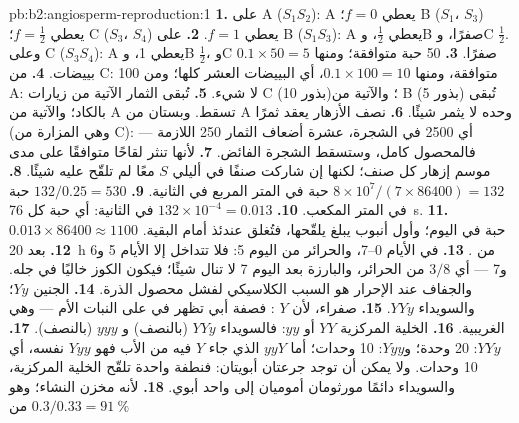 \begin{solution}{pb:b2:angiosperm-reproduction:1}
\textbf{1.} على A ($S_1S_2$):  A يعطي $f = 0$؛  B ($S_1$، $S_3$) يعطي $f =
\tfrac12$؛  C ($S_3$، $S_4$) يعطي $f = 1$.
\textbf{2.} على B ($S_1S_3$): A يعطي $\tfrac12$، وB صفرًا، وC $\tfrac12$. وعلى C
($S_3S_4$): A يعطي 1، وB $\tfrac12$، وC صفرًا.
\textbf{3.} 50 حبة متوافقة؛ ومنها $0.1\times 50 = 5$ بييضات.
\textbf{4.} من C: 100 متوافقة، ومنها $0.1\times 100 = 10$، أي
البييضات العشر كلها؛ ومن A: لا شيء.
\textbf{5.} تُبقى الثمار الآتية من زيارات C (10 بذور)؛ والآتية من B (5 بذور)
تُبقى بالكاد؛ والآتية من A تسقط. وبستان من A وحده لا يثمر شيئًا.
\textbf{6.} نصف الأزهار يعقد ثمرًا (وهي المزارة من C): أي 2500
 في الشجرة، عشرة أضعاف الثمار 250 اللازمة --- فالمحصول كامل،
وستسقط الشجرة الفائض.
\textbf{7.} لأنها تنثر لقاحًا متوافقًا على مدى موسم إزهار كل
صنف؛ لكنها إن شاركت صنفًا في أليلي $S$ معًا لم تلقّح عليه شيئًا.
\textbf{8.} $8\times 10^{7}/(7\times 86400) = 132$ حبة في المتر
المربع في الثانية.
\textbf{9.} $132/0.25 = 530$ حبة في المتر المكعب.
\textbf{10.} $132\times 10^{-4} = 0.013$ في الثانية: أي حبة كل
\qty{76}{s}.
\textbf{11.} $0.013\times 86400 \approx 1100$ حبة في اليوم؛ وأول
أنبوب يبلغ  يلقّحها، فتُغلق  عندئذ أمام البقية.
\textbf{12.} بعد \qty{20}{h} من .
\textbf{13.}  في الأيام 0--7، والحرائر من اليوم 5: فلا تتداخل
إلا الأيام 5 و6 و7 --- أي $3/8$ من الحرائر، والبارزة بعد
اليوم 7 لا تنال شيئًا؛ فيكون الكوز خاليًا في جله. والجفاف عند
الإحرار هو السبب الكلاسيكي لفشل محصول الذرة.
\textbf{14.} الجنين $Yy$؛ والسويداء $YYy$.
\textbf{15.} صفراء، لأن $Y$ : فصفة أبي  تظهر في 
على النبات الأم --- وهي الغريبية.
\textbf{16.} الخلية المركزية $YY$ أو $yy$: فالسويداء $YYy$ (بالنصف) و
$yyy$ (بالنصف).
\textbf{17.} $YYy$: 20 وحدة؛ و$Yyy$: 10 وحدات؛ أما $yyY$ الذي جاء $Y$
فيه من الأب فهو  $Yyy$ نفسه، أي 10 وحدات. ولا يمكن أن
توجد جرعتان أبويتان: فنطفة واحدة تلقّح الخلية المركزية، والسويداء
دائمًا مورثومان أموميان إلى واحد أبوي.
\textbf{18.} لأنه مخزن النشاء؛ وهو $0.3/0.33 = \qty{91}{\%}$ من

\end{solution}
